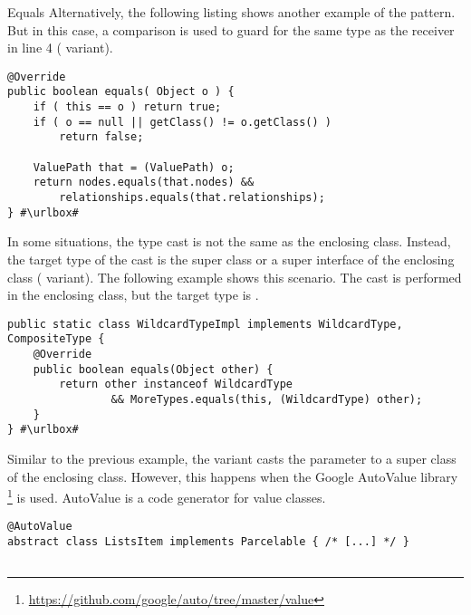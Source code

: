 \begin{pattern}{Equals}
Alternatively, the following listing shows another example of the \thisp{} pattern.
But in this case,
a  comparison is used to guard for the same type as the receiver in line 4 ( variant).

\def\urlvar{http://bit.ly/neo4j_neo4j_2vKP0MW}
\begin{verbatim}
@Override
public boolean equals( Object o ) {
    if ( this == o ) return true;
    if ( o == null || getClass() != o.getClass() )
        return false;

    ValuePath that = (ValuePath) o;
    return nodes.equals(that.nodes) &&
        relationships.equals(that.relationships);
} #\urlbox#
\end{verbatim}

In some situations, the type cast is not the same as the enclosing class.
Instead, the target type of the cast is the super class or a super interface of the enclosing class ( variant).
The following example shows this scenario.
The cast is performed in the  enclosing class,
but the target type is .

\def\urlvar{http://bit.ly/elastic_elasticsearch_2GHyPp5}
\begin{verbatim}
public static class WildcardTypeImpl implements WildcardType, CompositeType {
    @Override
    public boolean equals(Object other) {
        return other instanceof WildcardType
                && MoreTypes.equals(this, (WildcardType) other);
    }
} #\urlbox#
\end{verbatim}

Similar to the previous example, 
the  variant casts the  parameter to a super class of the enclosing class.
However, this happens when the Google AutoValue library%
\footnote{\url{https://github.com/google/auto/tree/master/value}}
is used.
AutoValue is a code generator for value classes.

\def\urlvar{http://bit.ly/square_sqlbrite_2HmHMYE}
\begin{verbatim}
@AutoValue
abstract class ListsItem implements Parcelable { /* [...] */ }


\end{verbatim}
\end{pattern}
